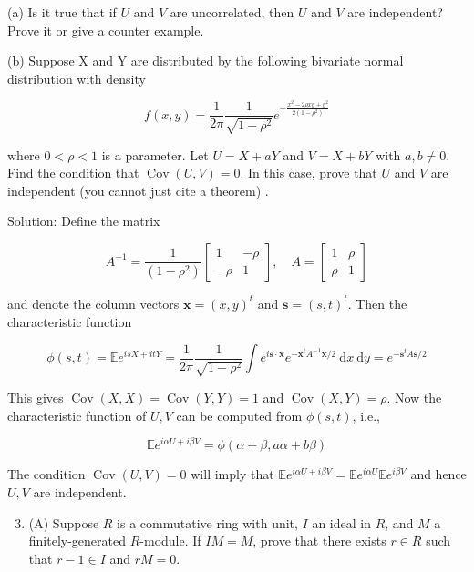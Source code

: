\documentclass[10pt]{article}
\begin{document}
(a) Is it true that if $U$ and $V$ are uncorrelated, then $U$ and $V$ are independent? Prove it or give a counter example.

(b) Suppose $\mathrm{X}$ and $\mathrm{Y}$ are distributed by the following bivariate normal distribution with density

$$
f(x, y)=\frac{1}{2 \pi} \frac{1}{\sqrt{1-\rho^{2}}} e^{-\frac{x^{2}-2 \rho x y+y^{2}}{2\left(1-\rho^{2}\right)}}
$$

where $0<\rho<1$ is a parameter. Let $U=X+a Y$ and $V=X+b Y$ with $a, b \neq 0$. Find the condition that $\operatorname{Cov}(U, V)=0$. In this case, prove that $U$ and $V$ are independent (you cannot just cite a theorem) .

Solution: Define the matrix

$$
A^{-1}=\frac{1}{\left(1-\rho^{2}\right)}\left[\begin{array}{cc}
1 & -\rho \\
-\rho & 1
\end{array}\right], \quad A=\left[\begin{array}{cc}
1 & \rho \\
\rho & 1
\end{array}\right]
$$

and denote the column vectors $\mathbf{x}=(x, y)^{t}$ and $\mathbf{s}=(s, t)^{t}$. Then the characteristic function

$$
\phi(s, t)=\mathbb{E} e^{i s X+i t Y}=\frac{1}{2 \pi} \frac{1}{\sqrt{1-\rho^{2}}} \int e^{i \mathbf{s} \cdot \mathbf{x}} e^{-\mathbf{x}^{t} A^{-1} \mathbf{x} / 2} \mathrm{~d} x \mathrm{~d} y=e^{-\mathbf{s}^{t} A \mathbf{s} / 2}
$$

This gives $\operatorname{Cov}(X, X)=\operatorname{Cov}(Y, Y)=1$ and $\operatorname{Cov}(X, Y)=\rho$. Now the characteristic function of $U, V$ can be computed from $\phi(s, t)$, i.e.,

$$
\mathbb{E} e^{i \alpha U+i \beta V}=\phi(\alpha+\beta, a \alpha+b \beta)
$$

The condition $\operatorname{Cov}(U, V)=0$ will imply that $\mathbb{E} e^{i \alpha U+i \beta V}=\mathbb{E} e^{i \alpha U} \mathbb{E} e^{i \beta V}$ and hence $U, V$ are independent.

\begin{enumerate}
  \setcounter{enumi}{2}
  \item (A) Suppose $R$ is a commutative ring with unit, $I$ an ideal in $R$, and $M$ a finitely-generated $R$-module. If $I M=M$, prove that there exists $r \in R$ such that $r-1 \in I$ and $r M=0$.
\end{enumerate}
\end{document}
